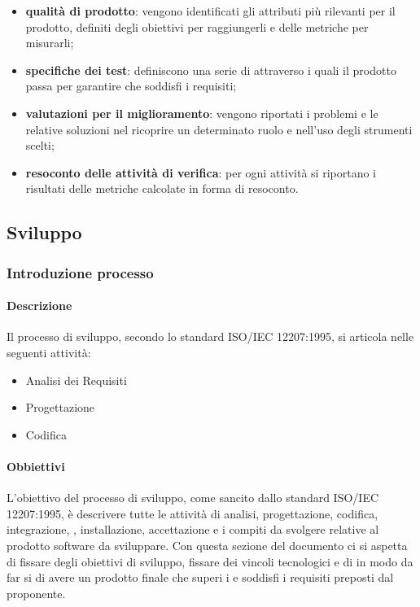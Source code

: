 \begin{itemize}
\begin{itemize}
                            \item\textbf{qualità di prodotto}: vengono identificati gli attributi più rilevanti per il prodotto, definiti degli obiettivi per raggiungerli e delle metriche per misurarli;
                            \item\textbf{specifiche dei test}: definiscono una serie di  attraverso i quali il prodotto passa per garantire che soddisfi i requisiti;
                            \item\textbf{valutazioni per il miglioramento}: vengono riportati i problemi e le relative soluzioni nel ricoprire un determinato ruolo e nell'uso degli strumenti scelti;
                            \item\textbf{resoconto delle attività di verifica}: per ogni attività si riportano i risultati delle metriche calcolate in forma di resoconto.
                        \end{itemize}
                \end{itemize}
    \subsection{Sviluppo}
        \subsubsection{Introduzione processo}
            \paragraph{Descrizione}
                Il processo di sviluppo, secondo lo standard ISO/IEC 12207:1995, si articola nelle seguenti attività:\\
                \begin{itemize}
                    \item Analisi dei Requisiti
                    \item Progettazione
                    \item Codifica
                \end{itemize}
            \paragraph{Obbiettivi}
                L'obiettivo del processo di sviluppo, come sancito dallo standard ISO/IEC 12207:1995, è descrivere tutte le attività di analisi, progettazione, codifica, integrazione, , installazione, accettazione e i compiti da svolgere relative al prodotto software da sviluppare. Con questa sezione del documento ci si aspetta di fissare degli obiettivi di sviluppo, fissare dei vincoli tecnologici e di  in modo da far si di avere un prodotto finale che superi i  e soddisfi i requisiti preposti dal proponente.\\

